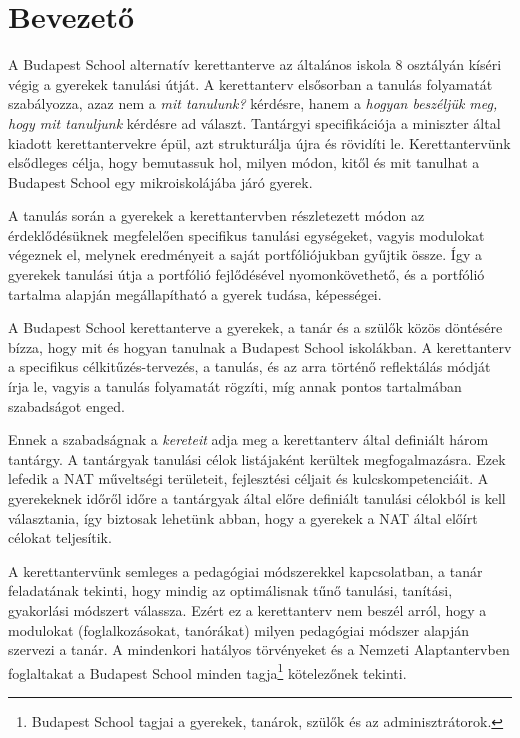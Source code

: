 \chapter{Bevezető}
A Budapest School alternatív kerettanterve az általános iskola 8 osztályán kíséri végig a gyerekek tanulási útját. A kerettanterv elsősorban a tanulás folyamatát szabályozza, azaz nem a \emph{mit tanulunk?} kérdésre, hanem a \emph{hogyan beszéljük meg, hogy mit tanuljunk} kérdésre ad választ. Tantárgyi specifikációja a miniszter által kiadott kerettantervekre\cite{ofi:kerettanterv} épül, azt strukturálja újra és rövidíti le. Kerettantervünk elsődleges célja, hogy bemutassuk hol, milyen módon, kitől és mit tanulhat a Budapest School egy mikroiskolájába járó gyerek.

A tanulás során a gyerekek a kerettantervben részletezett módon az érdeklődésüknek megfelelően specifikus tanulási egységeket, vagyis modulokat végeznek el, melynek eredményeit a saját portfóliójukban gyűjtik össze. Így a gyerekek tanulási útja a portfólió fejlődésével nyomonkövethető, és a portfólió tartalma alapján megállapítható a gyerek tudása, képességei.

A Budapest School kerettanterve a gyerekek, a tanár és a szülők közös döntésére  bízza, hogy mit és hogyan tanulnak a Budapest School iskolákban. A kerettanterv a specifikus célkitűzés-tervezés, a tanulás, és az arra történő  reflektálás módját írja le, vagyis a tanulás folyamatát rögzíti, míg annak pontos tartalmában szabadságot enged.

Ennek a szabadságnak a \emph{kereteit} adja meg a kerettanterv által definiált három tantárgy. A tantárgyak tanulási célok listájaként kerültek megfogalmazásra. Ezek lefedik a NAT műveltségi területeit, fejlesztési céljait és kulcskompetenciáit. A gyerekeknek időről időre a tantárgyak által előre definiált tanulási célokból is kell választania, így biztosak lehetünk abban, hogy a gyerekek a NAT által előírt célokat teljesítik.

A kerettantervünk semleges a pedagógiai módszerekkel kapcsolatban, a tanár feladatának tekinti, hogy mindig az optimálisnak tűnő tanulási, tanítási, gyakorlási módszert válassza. Ezért ez a kerettanterv nem beszél arról, hogy a modulokat (foglalkozásokat, tanórákat) milyen pedagógiai módszer alapján szervezi a tanár. A mindenkori hatályos törvényeket és a Nemzeti Alaptantervben foglaltakat a Budapest School minden tagja\footnote{Budapest School tagjai a gyerekek, tanárok, szülők és az adminisztrátorok.} kötelezőnek tekinti.

